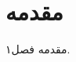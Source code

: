 \setcounter{secnumdepth}{0} %
\section{مقدمه}
\label{ch1.0}
\setcounter{secnumdepth}{1} %

مقدمه فصل۱.
